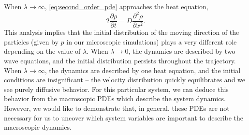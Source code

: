 \documentclass[prl, reprint, final, showkeys]{revtex4-1}
\begin{document}
When $\lambda \rightarrow \infty$, \eqref{eq:second_order_pde} approaches the heat equation,
\begin{equation}
2 \frac{\partial \rho}{\partial t} = D \frac{\partial ^2 \rho}{\partial x^2}.
\end{equation}
%
This analysis implies that the initial distribution of the moving direction of the particles (given by $p$ in our microscopic simulations) plays a very different role depending on the value of $\lambda$.
%
When $\lambda \rightarrow 0$, the dynamics are described by two wave equations, and the initial distribution persists throughout the trajectory.
%
When $\lambda \rightarrow \infty$, the dynamics are described by one heat equation, and the initial conditions are insignificant -- the velocity distribution quickly equilibrates and we see purely diffusive behavior.
%
For this particular system, we can deduce this behavior from the macroscopic PDEs which describe the system dynamics.
%
However, we would like to demonstrate that, in general, these PDEs are not necessary for us to uncover which system variables are important to describe the macroscopic dynamics.
 


\end{document}
